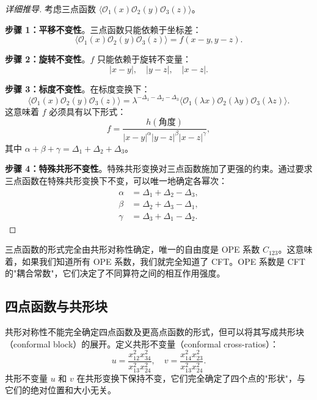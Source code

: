 \begin{proof}[详细推导]
考虑三点函数 $\langle \mathcal{O}_1(x) \mathcal{O}_2(y) \mathcal{O}_3(z) \rangle$。

\textbf{步骤 1：平移不变性}。三点函数只能依赖于坐标差：
\begin{equation}
    \langle \mathcal{O}_1(x) \mathcal{O}_2(y) \mathcal{O}_3(z) \rangle = f(x - y, y - z).
\end{equation}

\textbf{步骤 2：旋转不变性}。$f$ 只能依赖于旋转不变量：
\begin{equation}
    |x - y|, \quad |y - z|, \quad |x - z|.
\end{equation}

\textbf{步骤 3：标度不变性}。在标度变换下：
\begin{equation}
    \langle \mathcal{O}_1(x) \mathcal{O}_2(y) \mathcal{O}_3(z) \rangle = \lambda^{-\Delta_1 - \Delta_2 - \Delta_3} \langle \mathcal{O}_1(\lambda x) \mathcal{O}_2(\lambda y) \mathcal{O}_3(\lambda z) \rangle.
\end{equation}
这意味着 $f$ 必须具有以下形式：
\begin{equation}
    f = \frac{h(\text{角度})}{|x - y|^{\alpha} |y - z|^{\beta} |x - z|^{\gamma}},
\end{equation}
其中 $\alpha + \beta + \gamma = \Delta_1 + \Delta_2 + \Delta_3$。

\textbf{步骤 4：特殊共形不变性}。特殊共形变换对三点函数施加了更强的约束。通过要求三点函数在特殊共形变换下不变，可以唯一地确定各幂次：
\begin{align}
    \alpha &= \Delta_1 + \Delta_2 - \Delta_3, \\
    \beta &= \Delta_2 + \Delta_3 - \Delta_1, \\
    \gamma &= \Delta_3 + \Delta_1 - \Delta_2.
\end{align}
\end{proof}

\begin{remark}
三点函数的形式完全由共形对称性确定，唯一的自由度是 OPE 系数 $C_{123}$。这意味着，如果我们知道所有 OPE 系数，我们就完全知道了 CFT。OPE 系数是 CFT 的"耦合常数"，它们决定了不同算符之间的相互作用强度。
\end{remark}

\subsection{四点函数与共形块}

\begin{definition}[共形不变量]
共形对称性不能完全确定四点函数及更高点函数的形式，但可以将其写成共形块（conformal block）的展开。定义共形不变量（conformal cross-ratios）：
\begin{equation}
    u = \frac{x_{12}^2 x_{34}^2}{x_{13}^2 x_{24}^2}, \quad v = \frac{x_{14}^2 x_{23}^2}{x_{13}^2 x_{24}^2}.
\end{equation}
共形不变量 $u$ 和 $v$ 在共形变换下保持不变，它们完全确定了四个点的"形状"，与它们的绝对位置和大小无关。
\end{definition}


